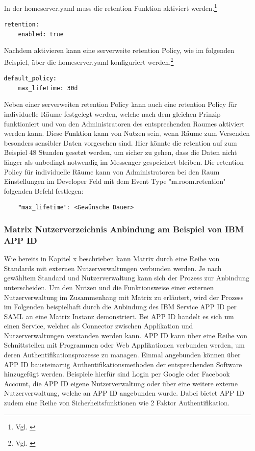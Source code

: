 In der homeserver.yaml muss die retention Funktion aktiviert werden.\footnote{Vgl. \cite{Matrix.org-retentio-policies2020}}

\begin{lstlisting}
retention:
    enabled: true
\end{lstlisting}

Nachdem aktivieren kann eine serverweite retention Policy, wie im folgenden Beispiel, über die homeserver.yaml konfiguriert werden.\footnote{Vgl. \cite{Matrix.org-retentio-policies2020}}

\begin{lstlisting}
default_policy:
    max_lifetime: 30d
\end{lstlisting}


Neben einer serverweiten retention Policy kann auch eine retention Policy für individuelle Räume festgelegt werden, welche nach dem gleichen Prinzip funktioniert und von den Administratoren des entsprechenden Raumes aktiviert werden kann. Diese Funktion kann von Nutzen sein, wenn Räume zum Versenden besonders sensibler Daten vorgesehen sind. Hier könnte die retention auf zum Beispiel 48 Stunden gesetzt werden, um sicher zu gehen, dass die Daten nicht länger als unbedingt notwendig im Messenger gespeichert bleiben. Die retention Policy für individuelle Räume kann von Administratoren bei den Raum Einstellungen im Developer Feld mit dem Event Type "m.room.retention" folgenden Befehl festlegen:

\begin{lstlisting}
    "max_lifetime": <Gewünsche Dauer>
\end{lstlisting}

\subsubsection{Matrix Nutzerverzeichnis Anbindung am Beispiel von IBM APP ID}\label{chapter:vdmf}
Wie bereits in Kapitel x beschrieben kann Matrix durch eine Reihe von Standards mit externen Nutzerverwaltungen verbunden werden.
Je nach gewähltem Standard und Nutzerverwaltung kann sich der Prozess zur Anbindung unterscheiden. Um den Nutzen und die Funktionsweise einer externen Nutzerverwaltung im Zusammenhang mit Matrix zu erläutert, wird der Prozess im Folgenden beispielhaft durch die Anbindung des IBM Service APP ID per SAML an eine Matrix Instanz demonstriert. Bei APP ID handelt es sich um einen Service, welcher als Connector zwischen Applikation und Nutzerverwaltungen verstanden werden kann. APP ID kann über eine Reihe von Schnittstellen mit Programmen oder Web Applikationen verbunden werden, um deren Authentifikationsprozesse zu managen. Einmal angebunden können über APP ID bausteinartig Authentifikationsmethoden der entsprechenden Software hinzugefügt werden. Beispiele hierfür sind Login per Google oder Facebook Account, die APP ID eigene Nutzerverwaltung oder über eine weitere externe Nutzerverwaltung, welche an APP ID angebunden wurde. Dabei bietet APP ID zudem eine Reihe von Sicherheitsfunktionen wie 2 Faktor Authentifikation.

